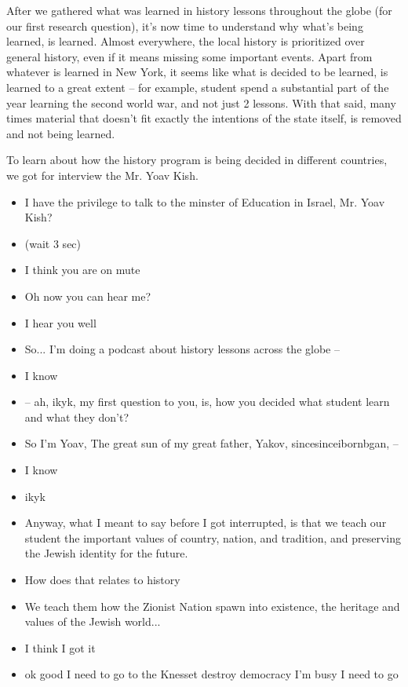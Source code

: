 \documentclass[]{../../../../tex/classes/styledArticle}
\begin{document}
	After we gathered what was learned in history lessons throughout the globe (for our first research question), it's now time to understand why what's being learned, is learned. Almost everywhere, the local history is prioritized over general history, even if it means missing some important events. Apart from whatever is learned in New York, it seems like what is decided to be learned, is learned to a great extent -- for example, student spend a substantial part of the year learning the second world war, and not just 2 lessons. With that said, many times material that doesn't fit exactly the intentions of the state itself, is removed and not being learned. 
	
	To learn about how the history program is being decided in different countries, we got for interview the Mr. Yoav Kish. 
	
	\begin{itemize}
		\item[(I)] I have the privilege to talk to the minster of Education in Israel, Mr. Yoav Kish? 
		\item[(II)] (wait 3 sec)
		\item[(I)] I think you are on mute
		\item[(II)] Oh now you can hear me? 
		\item[(I)] I hear you well 
		\item[(II)] So... I'm doing a podcast about history lessons across the globe --
		\item[(I)] I know
		\item[(II)] -- ah, ikyk, my first question to you, is, how you decided what student learn and what they don't? 
		\item[(I)] So I'm Yoav, The great sun of my great father, Yakov, sincesinceibornbgan, --
		\item[(II)] I know
		\item[(I)] ikyk
		\item[(II)] Anyway, what I meant to say before I got interrupted, is that we teach our student the important values of country, nation, and tradition, and preserving the Jewish identity for the future. 
		\item[(I)] How does that relates to history
		\item[(II)] We teach them how the Zionist Nation spawn into existence, the heritage and values of the Jewish world... 
		\item[(I)] I think I got it
		\item[(II)] ok good I need to go to the Knesset destroy democracy I'm busy I need to go 
	\end{itemize}
	
\end{document}
